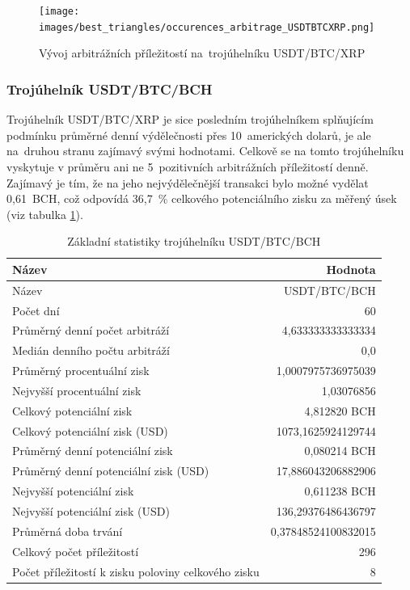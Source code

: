 \documentclass[thesis=B,czech]{FITthesis}[2019/03/21]
\begin{document}
\begin{figure}\centering
	\texttt{[image: images/best\_triangles/occurences\_arbitrage\_USDTBTCXRP.png]}
	\caption{Vývoj arbitrážních příležitostí na~trojúhelníku USDT/BTC/XRP }\label{occurences_arbitrage_USDTBTCXRP}
\end{figure}


\subsubsection{Trojúhelník USDT/BTC/BCH}
Trojúhelník USDT/BTC/XRP je sice posledním trojúhelníkem splňujícím podmínku průměrné denní výdělečnosti přes 10~amerických dolarů, je ale na~druhou stranu zajímavý svými hodnotami. Celkově se na tomto trojúhelníku vyskytuje v průměru ani ne 5~pozitivních arbitrážních příležitostí denně. Zajímavý je tím, že na jeho nejvýdělečnější transakci bylo možné vydělat 0,61~BCH, což odpovídá 36,7~\% celkového potenciálního zisku za měřený úsek (viz tabulka \ref{USDTBTCBCH_stats}).

\begin{table}\centering
\caption{Základní statistiky trojúhelníku USDT/BTC/BCH}
\label{USDTBTCBCH_stats}
\begin{tabular}{|| l | r ||}
\hline Název & Hodnota \\ 
\hline\hline Název & USDT/BTC/BCH \\ 
\hline Počet dní & 60 \\ 
\hline Průměrný denní počet arbitráží & 4,633333333333334 \\ 
\hline Medián denního počtu arbitráží & 0,0 \\ 
\hline Průměrný procentuální zisk & 1,0007975736975039 \\ 
\hline Nejvyšší procentuální zisk & 1,03076856 \\ 
\hline Celkový potenciální zisk & 4,812820 BCH \\ 
\hline Celkový potenciální zisk (USD) & 1073,1625924129744 \\ 
\hline Průměrný denní potenciální zisk & 0,080214 BCH \\ 
\hline Průměrný denní potenciální zisk (USD) & 17,886043206882906 \\ 
\hline Nejvyšší potenciální zisk & 0,611238 BCH \\ 
\hline Nejvyšší potenciální zisk (USD) & 136,29376486436797 \\ 
\hline Průměrná doba trvání & 0,37848524100832015 \\ 
\hline Celkový počet příležitostí & 296 \\ 
\hline Počet příležitostí k zisku poloviny celkového zisku & 8 \\ 
\hline
\end{tabular}
\end{table}
\end{document}
